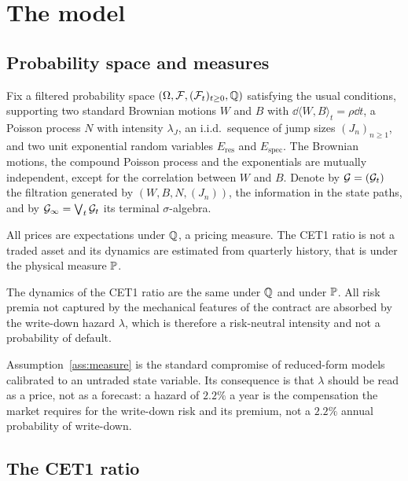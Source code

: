 \section{The model}\label{sec:model}

\subsection{Probability space and measures}

Fix a filtered probability space $(\Omega,\mathcal{F},(\mathcal{F}_t)_{t\ge0},\mathbb{Q})$ satisfying the usual
conditions, supporting two standard Brownian motions $W$ and $B$ with
$\dd\langle W,B\rangle_t=\rho\dd t$, a Poisson process $N$ with intensity $\lambda_J$,
an i.i.d.\ sequence of jump sizes $(J_n)_{n\ge1}$, and two unit exponential random
variables $E_{\mathrm{res}}$ and $E_{\mathrm{spec}}$. The Brownian motions, the
compound Poisson process and the exponentials are mutually independent, except for the
correlation between $W$ and $B$. Denote by $\mathcal{G}=(\mathcal{G}_t)$ the filtration generated by
$(W,B,N,(J_n))$, the information in the state paths, and by
$\mathcal{G}_\infty=\bigvee_t\mathcal{G}_t$ its terminal $\sigma$-algebra.

All prices are expectations under $\mathbb{Q}$, a pricing measure. The CET1 ratio is not a
traded asset and its dynamics are estimated from quarterly history, that is under the
physical measure $\mathbb{P}$.

\begin{assumption}\label{ass:measure}
The dynamics of the CET1 ratio are the same under $\mathbb{Q}$ and under $\mathbb{P}$. All risk
premia not captured by the mechanical features of the contract are absorbed by the
write-down hazard $\lambda$, which is therefore a risk-neutral intensity and not a
probability of default.
\end{assumption}

Assumption~\ref{ass:measure} is the standard compromise of reduced-form models
calibrated to an untraded state variable. Its consequence is that $\lambda$ should be
read as a price, not as a forecast: a hazard of $2.2\%$ a year is the compensation the
market requires for the write-down risk and its premium, not a $2.2\%$ annual
probability of write-down.

\subsection{The CET1 ratio}

